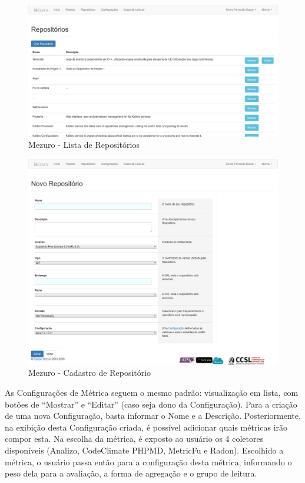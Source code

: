 \begin{figure}[!htb]
	\centering
    \includegraphics[keepaspectratio=true,scale=0.3]
    {figuras/mezuro-repositorios-v2.eps}
  \caption{Mezuro - Lista de Repositórios}
	\label{fig:mezuro-repositorios-v2}
\end{figure}

\newpage

\begin{figure}[!htb]
	\centering
    \includegraphics[keepaspectratio=true,scale=0.3]
    {figuras/mezuro-repositorio-cadastro.eps}
  \caption{Mezuro - Cadastro de Repositório}
	\label{fig:mezuro-repositorio-cadastro}
\end{figure}

\newpage

As Configurações de Métrica seguem o mesmo padrão: visualização em lista, com
botões de ``Mostrar'' e ``Editar'' (caso seja dono da Configuração). Para a criação
de uma nova Configuração, basta informar o Nome e a Descrição. Posteriormente, na
exibição desta Configuração criada, é possível adicionar quais métricas irão
compor esta. Na escolha da métrica, é exposto ao usuário os 4 coletores
disponíveis (Analizo, CodeClimate PHPMD, MetricFu e Radon). Escolhido a métrica,
o usuário passa então para a configuração desta métrica, informando o peso dela
para a avaliação, a forma de agregação e o grupo de leitura.


